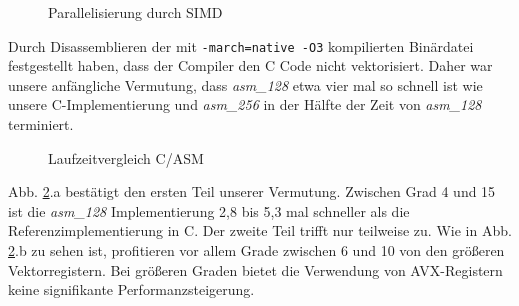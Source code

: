 \documentclass[course=erap]{aspdoc}
\begin{document}
\begin{figure}[htbp] 
    \centering
    \caption{Parallelisierung durch SIMD}%
    \label{fig:SIMD}%
\end{figure}

Durch Disassemblieren der mit \texttt{-march=native -O3} kompilierten Binärdatei festgestellt haben, dass der Compiler den C Code nicht vektorisiert. Daher war unsere anfängliche Vermutung, dass \textit{asm\_128} etwa vier mal so schnell ist wie unsere C-Implementierung und \textit{asm\_256} in der Hälfte der Zeit von \textit{asm\_128} terminiert.

\begin{figure}[htbp] 
    \centering
    \qquad
    \caption{Laufzeitvergleich C/ASM}%
    \label{fig:Laufzeitvergleich Speedup}%
 \end{figure}
 
 Abb. \ref{fig:Laufzeitvergleich Speedup}.a bestätigt den ersten Teil unserer Vermutung. Zwischen Grad 4 und 15 ist die \textit{asm\_128} Implementierung 2,8 bis 5,3 mal schneller als die Referenzimplementierung in C. Der zweite Teil trifft nur teilweise zu. Wie in Abb. \ref{fig:Laufzeitvergleich Speedup}.b zu sehen ist, profitieren vor allem Grade zwischen 6 und 10 von den größeren Vektorregistern. Bei größeren Graden bietet die Verwendung von AVX-Registern keine signifikante Performanzsteigerung.
 
\end{document}

